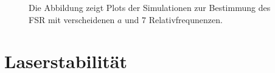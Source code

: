 \begin{figure}[h]
{{{		}
	}}
	\caption[Simulationen Nonius-Methode]{Die Abbildung zeigt Plots der
	Simulationen zur Bestimmung des FSR mit verscheidenen $a$ und $7$ Relativfrequnenzen.}
	\label{fig:nonius_FSR_simulation}
\end{figure}

\section{Laserstabilität}\label{anh:sec:laserstabilitaet}
